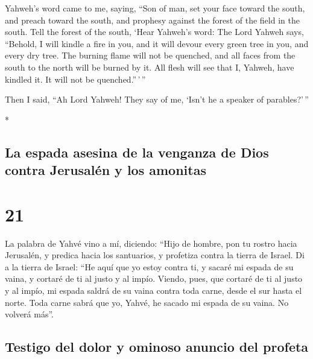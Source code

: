 \begin{paracol}{2}
\begin{otherlanguage}{english}
 Yahweh's word came to me, saying,  ``Son
of man, set your face toward the south, and preach toward the south, and
prophesy against the forest of the field in the south. 
Tell the forest of the south, `Hear Yahweh's word: The Lord Yahweh says,
``Behold, I will kindle a fire in you, and it will devour every green
tree in you, and every dry tree. The burning flame will not be quenched,
and all faces from the south to the north will be burned by it.
 All flesh will see that I, Yahweh, have kindled it. It
will not be quenched.''\,'\,''

 Then I said, ``Ah Lord Yahweh! They say of me, `Isn't he
a speaker of parables?'\,''

\end{otherlanguage}

\switchcolumn[0]*

\hypertarget{la-espada-asesina-de-la-venganza-de-dios-contra-jerusaluxe9n-y-los-amonitas}{%
\subsection{La espada asesina de la venganza de Dios contra Jerusalén y
los
amonitas}\label{la-espada-asesina-de-la-venganza-de-dios-contra-jerusaluxe9n-y-los-amonitas}}

\hypertarget{section-40}{%
\section{21}\label{section-40}}

 La palabra de Yahvé vino a mí, diciendo: 
``Hijo de hombre, pon tu rostro hacia Jerusalén, y predica hacia los
santuarios, y profetiza contra la tierra de Israel.  Di a
la tierra de Israel: ``He aquí que yo estoy contra ti, y sacaré mi
espada de su vaina, y cortaré de ti al justo y al impío. 
Viendo, pues, que cortaré de ti al justo y al impío, mi espada saldrá de
su vaina contra toda carne, desde el sur hasta el norte. 
Toda carne sabrá que yo, Yahvé, he sacado mi espada de su vaina. No
volverá más''.

\hypertarget{testigo-del-dolor-y-ominoso-anuncio-del-profeta}{%
\subsection{Testigo del dolor y ominoso anuncio del
profeta}\label{testigo-del-dolor-y-ominoso-anuncio-del-profeta}}


\end{paracol}
